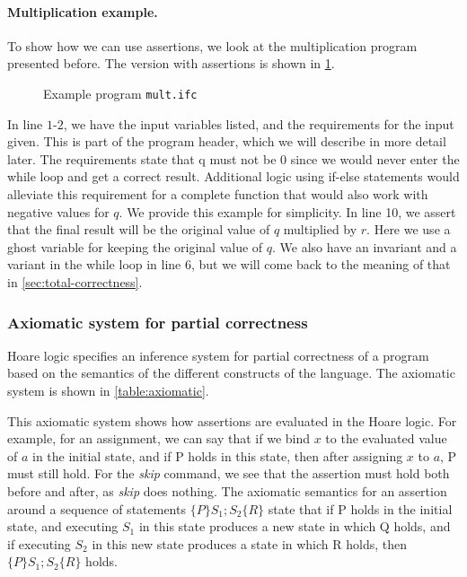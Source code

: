 \paragraph{Multiplication example.}
To show how we can use assertions, we look at the multiplication program presented before. The version with assertions is shown in \cref{figure:mult}.
\begin{figure}

\caption{Example program \texttt{mult.ifc}}
\label{figure:mult}
\end{figure}

In line $1$-$2$, we have the input variables listed, and the requirements for the input given.
This is part of the program header, which we will describe in more detail later.
The requirements state that q must not be 0 since we would never enter the while loop and get a correct result. Additional logic using if-else statements would alleviate this requirement for a complete function that would also work with negative values for $q$. We provide this example for simplicity.
In line 10, we assert that the final result will be the original value of $q$ multiplied by $r$.
Here we use a ghost variable for keeping the original value of $q$.
We also have an invariant and a variant in the while loop in line 6, but we will come back to the meaning of that in \cref{sec:total-correctness}.


\subsubsection{Axiomatic system for partial correctness}
Hoare logic specifies an inference system for partial correctness of a program based on the semantics of the different constructs of the language. The axiomatic system is shown in \cref{table:axiomatic}.

This axiomatic system shows how assertions are evaluated in the Hoare logic.
For example, for an assignment, we can say that if we bind $x$ to the evaluated value of $a$ in the initial state, and if P holds in this state, then after assigning $x$ to $a$, P must still hold.
For the \textit{skip} command, we see that the assertion must hold both before and after, as \textit{skip} does nothing.
The axiomatic semantics for an assertion around a sequence of statements $\{P\} S_1;S_2\{R\}$ state that if P holds in the initial state, and executing $S_1$ in this state produces a new state in which Q holds, and if executing $S_2$ in this new state produces a state in which R holds, then $\{P\} S_1;S_2 \{R\}$ holds.

